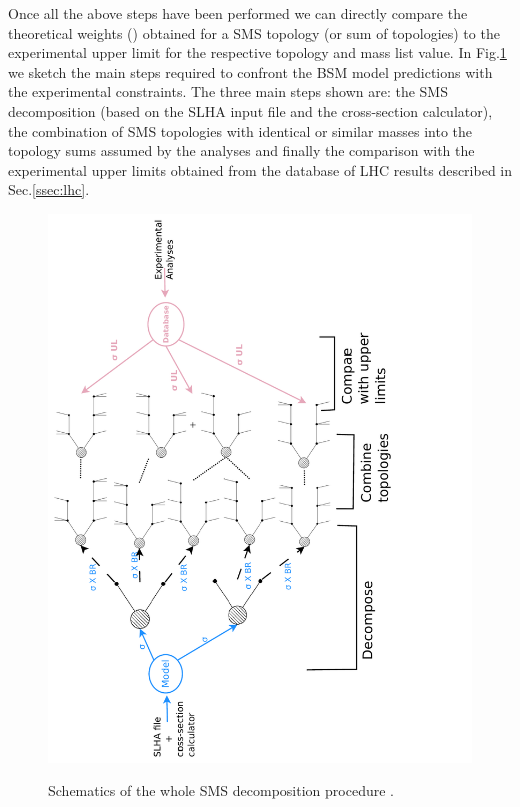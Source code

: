 Once all the above steps have been performed we can directly compare the theoretical weights (\sigmaXBF) obtained for a SMS
topology (or sum of topologies) to the experimental upper limit for the respective topology and mass list value.
In Fig.\ref{fig:smsdecomposition} we sketch the main steps required to confront the BSM model predictions with the 
experimental constraints. The three main steps shown are: the SMS decomposition (based on the SLHA input file and the cross-section calculator),
the combination of SMS topologies with identical or similar masses into the topology sums assumed by the analyses and finally the
comparison with the experimental upper limits obtained from the database of LHC results described in Sec.\ref{ssec:lhc}.


\begin{figure}[h!t]\centering
\includegraphics[width=0.9\linewidth,clip,angle=270]{figures/Scheme1.pdf}
\label{fig:smsdecomposition}
\caption{Schematics of the whole SMS decomposition procedure .}
\end{figure}


\FloatBarrier
